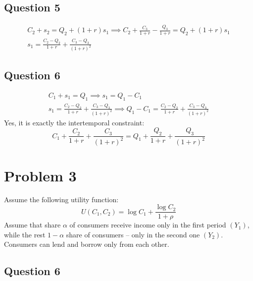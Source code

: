 \documentclass[11pt, oneside]{article}
\begin{document}
\subsection*{Question 5}
\begin{gather*}
C_{2} + s_{2}  = Q_{2} + (1+r)s_{1} \implies  C_{2} + \frac{C_3}{1 + r} - \frac{Q_{3}}{1 + r}  = Q_{2} + (1+r)s_{1}\\
s_{1} = \frac{C_{2} - Q_{2}}{1+r} +  \frac{C_{3} - Q_{3}}{(1+r)^{2}}
\end{gather*}
\subsection*{Question 6}
\begin{gather*}
C_{1} + s_{1}  = Q_{1} \implies  s_{1} = Q_{1} - C_{1}\\
s_{1} = \frac{C_{2} - Q_{2}}{1+r} +  \frac{C_{3} - Q_{3}}{(1+r)^{2}} \implies Q_{1} - C_{1} = \frac{C_{2} - Q_{2}}{1+r} +  \frac{C_{3} - Q_{3}}{(1+r)^{2}}
\end{gather*}
Yes, it is exactly the intertemporal constraint:
\[
C_{1} + \frac{C_{2}}{1+r } + \frac{C_{3}}{(1+r)^{2}} = Q_{1} + \frac{Q_{2}}{1+r} + \frac{Q_{3}}{(1+r)^{2}}
\]
\clearpage
\section*{Problem 3}
Assume the following utility function: 
\[
U(C_{1}, C_{2}) = \log C_{1} + \frac{\log C_{2}}{1 + \rho }
\]
Assume that share $ \alpha $ of
consumers receive income only in the first period $ (Y_1) $, while the rest $ 1- \alpha $ share of consumers -- only in
the second one $ (Y_2) $. Consumers can lend and borrow only from each other.
\subsection*{Question 6}
\clearpage
\end{document}
